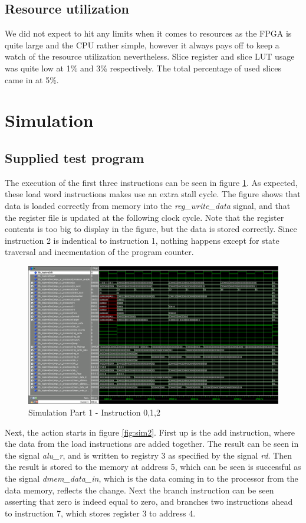 \subsection{Resource utilization}
We did not expect to hit any limits when it comes to resources as the FPGA is quite large and the CPU rather simple, however it always pays off to keep a watch of the resource utilization nevertheless.
Slice register and slice LUT usage was quite low at 1\% and 3\% respectively.
The total percentage of used slices came in at 5\%.

\section{Simulation}
\subsection{Supplied test program}
The execution of the first three instructions can be seen in figure \ref{fig:sim1}. As expected, these load word instructions makes use an extra stall cycle. The figure shows that data is loaded correctly from memory into the \emph{reg_write_data} signal, and that the register file is updated at the following clock cycle. Note that the register contents is too big to display in the figure, but the data is stored correctly. Since instruction 2 is indentical to instruction 1, nothing happens except for state traversal and incementation of the program counter.
\begin{figure}[ht]
    \centering
    \includegraphics[scale=0.3]{figures/sim1.png}
    \caption{\label{fig:sim1}Simulation Part 1 - Instruction 0,1,2}
\end{figure}

Next, the action starts in figure \ref{fig:sim2}. First up is the add instruction, where the data from the load instructions are added together. The result can be seen in the signal \emph{alu_r}, and is written to registry 3 as specified by the signal \emph{rd}. Then the result is stored to the memory at address 5, which can be seen is successful as the signal \emph{dmem_data_in}, which is the data coming in to the processor from the data memory, reflects the change. Next the branch instruction can be seen asserting that zero is indeed equal to zero, and branches two instructions ahead to instruction 7, which stores register 3 to address 4.

